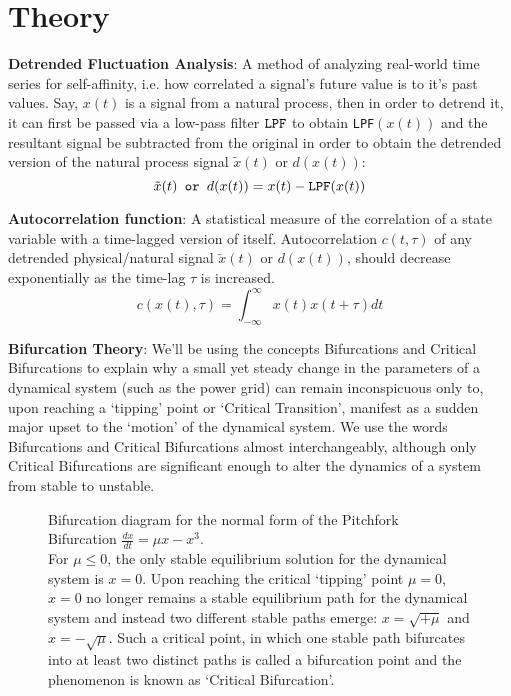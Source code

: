 \section[Theory]{Theory}
\label{sec:theory}

\textbf{Detrended Fluctuation Analysis}: A method of analyzing real-world time series for self-affinity, i.e. how correlated a signal's future value is to it's past values. Say, $x(t)$ is a signal from a natural process, then in order to detrend it, it can first be passed via a low-pass filter $\verb|LPF|$ to obtain \verb|LPF|$(x(t))$ and the resultant signal be subtracted from the original in order to obtain the detrended version of the natural process signal $\tilde{x}(t)$ or $d(x(t))$:
\begin{equation}
	\tilde{x}(t) \verb| or | d(x(t)) = x(t) - \verb|LPF|(x(t))
\end{equation}

\textbf{Autocorrelation function}: A statistical measure of the correlation of a state variable with a time-lagged version of itself. Autocorrelation $c(t, \tau)$ of any detrended physical/natural signal $\tilde{x}(t)$ or $d(x(t))$, should decrease exponentially as the time-lag $\tau$ is increased.
\begin{equation}
	c(x(t), \tau) = \int_{-\infty}^{\infty}x(t)x(t+\tau)dt  
\end{equation}

\textbf{Bifurcation Theory}: We'll be using the concepts Bifurcations and Critical Bifurcations to explain why a small yet steady change in the parameters of a dynamical system (such as the power grid) can remain inconspicuous only to, upon reaching a `tipping' point or `Critical Transition', manifest as a sudden major upset to the `motion' of the dynamical system. We use the words Bifurcations and Critical Bifurcations almost interchangeably, although only Critical Bifurcations are significant enough to alter the dynamics of a system from stable to unstable.


\begin{figure}[ht]
	\caption{Bifurcation diagram for the normal form of the Pitchfork Bifurcation $\frac{dx}{dt} = \mu x - x^3$. \\ For $\mu \leq 0$, the only stable equilibrium solution for the dynamical system is $x=0$. Upon reaching the critical `tipping' point $\mu=0$, $x=0$ no longer remains a stable equilibrium path for the dynamical system and instead two different stable paths emerge: $x = \sqrt{+\mu}$ and $x = -\sqrt{\mu}$. Such a critical point, in which one stable path bifurcates into at least two distinct paths is called a bifurcation point and the phenomenon is known as `Critical Bifurcation'.}
\end{figure}


